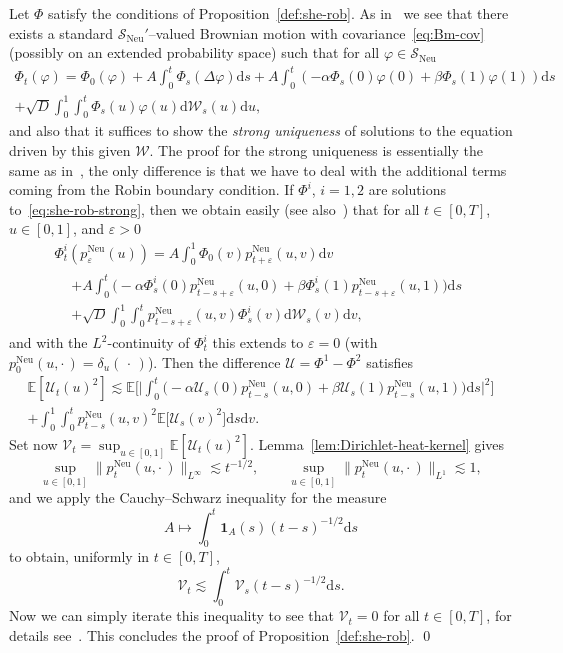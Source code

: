 \documentclass[AHL,Unicode,longabstracts]{cedram}
\DeclareMathOperator{\Neu}{Neu}
\newcommand{\bb}[1]{{\mathbb #1}}
\newcommand{\mc}[1]{{\mathcal #1}}
\renewcommand{\mc}[1]{{\mathcal #1}}
\newcommand{\mb}[1]{{\mathbf #1}}
\newcommand{\SN}{\ensuremath{\mc S_{\Neu}}}
\newcommand*{\dd}{\mathrm{d}}
\newcommand*{\ds}{\dd s}
\newcommand*{\du}{\dd u}
\newcommand*{\dv}{\dd v}
\begin{document}
Let $\Phi$ satisfy the conditions of Proposition~\ref{def:she-rob}. As in~\cite[Chapter~5]{BerG} we see that there exists a standard $\SN'$--valued Brownian motion with covariance~\eqref{eq:Bm-cov} (possibly on an extended probability space) such that for all $\varphi \in \SN$
\begin{multline}
\Phi_t(\varphi) = \Phi_0(\varphi) + A \int_0^t \Phi_s(\Delta \varphi) \ds + A \int_0^t (- \alpha \Phi_s(0) \varphi(0)+ \beta \Phi_s(1) \varphi(1)) \ds\\
+ \sqrt{D} \int_0^1 \int_0^t \Phi_s(u) \varphi(u) \dd\mc W_s(u) \du,\label{eq:she-rob-strong}
\end{multline}
and also that it suffices to show the \emph{strong uniqueness} of solutions to the equation driven by this given $\mc W$. The proof for the strong uniqueness is essentially the same as in~\cite[Theorem~3.2]{Walsh1986}, the only difference is that we have to deal with the additional terms coming from the Robin boundary condition. If $\Phi^i$, $i=1,2$ are solutions to~\eqref{eq:she-rob-strong}, then we obtain easily (see also~\cite[Exercise~3.1]{Walsh1986}) that for all $t \in [0,T]$, $u\in [0,1]$, and $\varepsilon > 0$
\begin{multline*}
\Phi_t^i(p^{\Neu}_\varepsilon(u)) = A \int_0^1 \Phi_0(v) p^{\Neu}_{t+\varepsilon}(u,v)\dv \\
\begin{aligned}
& + A \int_0^t \big(- \alpha \Phi^i_s(0) p_{t-s+\varepsilon}^{\Neu}(u,0)+ \beta \Phi^i_s(1) p_{t-s+\varepsilon}^{\Neu}(u,1)\big) \ds \\
& + \sqrt{D} \int_0^1 \int_0^t p^{\Neu}_{t-s+\varepsilon}(u,v) \Phi^i_s(v) \dd\mc W_s(v) \dv,
\end{aligned}
\end{multline*}
and with the $L^2$-continuity of $\Phi^i_t$ this extends to $\varepsilon = 0$ (with $p^{\Neu}_0(u,\cdot\,) = \delta_u({\,\cdot\,})$). Then the difference $\mc U = \Phi^1 - \Phi^2$ satisfies
\begin{multline*}
\bb E[\mc U_t(u)^2] \lesssim \bb E\Big[\Big|\int_0^t \big(- \alpha \mc U_s(0) p_{t-s}^{\Neu}(u,0)+ \beta \mc U_s(1) p_{t-s}^{\Neu}(u,1)\big) \ds \Big|^2 \Big] \\
+ \int_0^1 \int_0^t p^{\Neu}_{t-s}(u,v)^2 \bb E\big[\mc U_s(v)^2\big] \ds \dv.
\end{multline*}
Set now $\mc V_t = \sup_{u \in [0,1]} \bb E[\mc U_t(u)^2]$. Lemma~\ref{lem:Dirichlet-heat-kernel} gives
\[
\sup_{u \in [0,1]} \big\| p^{\Neu}_t(u,\cdot\,)\big\|_{L^\infty} \lesssim t^{-1/2},\qquad \sup_{u \in [0,1]} \big\| p^{\Neu}_t(u,\cdot\,)\big\|_{L^1} \lesssim 1,
\]
and we apply the Cauchy--Schwarz inequality for the measure
\[
A \mapsto \int_0^t \mb 1_A(s) (t- s)^{-1/2} \ds
\]
to obtain, uniformly in $t \in [0,T]$,
\[
\mc V_t \lesssim \int_0^t \mc V_s (t-s)^{-1/2} \ds.
\]
Now we can simply iterate this inequality to see that $\mc V_t = 0$ for all $t \in [0,T]$, for details see~\cite[Theorem~3.2]{Walsh1986}. This concludes the proof of Proposition~\ref{def:she-rob}. \qed
\medskip
\end{document}

